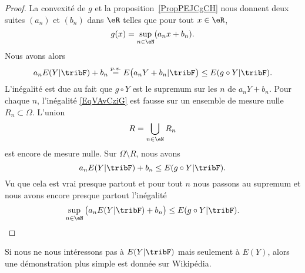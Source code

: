 \begin{proof}
	La convexité de \( g\) et la proposition~\ref{PropPEJCgCH} nous donnent deux suites \( (a_n)\) et \( (b_n)\) dans \( \eR\) telles que pour tout \( x\in \eR\),
	\begin{equation}
		g(x)=\sup_{n\in \eN}(a_nx+b_n).
	\end{equation}
	Nous avons alors
	\begin{equation}    \label{EqVAvCziG}
		a_nE(Y|\tribF)+b_n\stackrel{p.s.}{=}E\big( a_nY+b_n|\tribF \big)\leq  E(g\circ Y|\tribF).
	\end{equation}
	L'inégalité est due au fait que \( g\circ Y\) est le supremum sur les \( n\) de \( a_nY+b_n\). Pour chaque \( n\), l'inégalité \eqref{EqVAvCziG} est fausse sur un ensemble de mesure nulle \( R_n\subset\Omega\). L'union
	\begin{equation}
		R=\bigcup_{n\in \eN}R_n
	\end{equation}
	est encore de mesure nulle. Sur \( \Omega\setminus R\), nous avons
	\begin{equation}
		a_nE(Y|\tribF)+b_n\leq E(g\circ Y|\tribF).
	\end{equation}
	Vu que cela est vrai presque partout et pour tout \( n\) nous passons au supremum et nous avons encore presque partout l'inégalité
	\begin{equation}
		\sup_{n\in\eN}\big( a_nE(Y|\tribF)+b_n \big)\leq E(g\circ Y|\tribF).
	\end{equation}
\end{proof}

Si nous ne nous intéressons pas à \( E(Y|\tribF)\) mais seulement à \( E(Y)\), alors une démonstration plus simple est donnée sur Wikipédia\cite{YMmJevi}.
